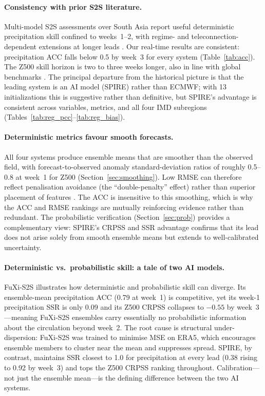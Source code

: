 \documentclass[11pt]{article}
\begin{document}
\paragraph{Consistency with prior S2S literature.}
Multi-model S2S assessments over South Asia report useful deterministic
precipitation skill confined to weeks~1--2, with regime- and
teleconnection-dependent extensions at longer leads
\citep{deandrade2019,white2017,mariotti2020}. Our real-time results are
consistent: precipitation ACC falls below 0.5 by week~3 for every system
(Table~\ref{tab:acc}). The Z500 skill horizon is two to three weeks
longer, also in line with global benchmarks \citep{vitart2017,rasp2024}.
The principal departure from the historical picture is that the leading
system is an AI model (SPIRE) rather than ECMWF; with 13 initializations
this is suggestive rather than definitive, but SPIRE's advantage is
consistent across variables, metrics, and all four IMD subregions
(Tables~\ref{tab:reg_pcc}--\ref{tab:reg_bias}).

\paragraph{Deterministic metrics favour smooth forecasts.}
All four systems produce ensemble means that are smoother than
the observed field, with forecast-to-observed anomaly standard-deviation
ratios of roughly 0.5--0.8 at week~1 for Z500 (Section~\ref{sec:smoothing}).
Low RMSE can therefore reflect penalisation avoidance (the ``double-penalty''
effect) rather than superior placement of features
\citep{murphy1988,benbouallegue2024}. The ACC is insensitive to this
smoothing, which is why the ACC and RMSE rankings are mutually reinforcing
evidence rather than redundant. The probabilistic verification
(Section~\ref{sec:prob}) provides a complementary view: SPIRE's CRPSS
and SSR advantage confirms that its lead does not arise solely from smooth
ensemble means but extends to well-calibrated uncertainty.

\paragraph{Deterministic vs.\ probabilistic skill: a tale of two AI models.}
FuXi-S2S illustrates how deterministic and probabilistic skill can
diverge. Its ensemble-mean precipitation ACC (0.79 at week~1) is
competitive, yet its week-1 precipitation SSR is only 0.09 and its Z500
CRPSS collapses to $-0.55$ by week~3---meaning FuXi-S2S ensembles carry
essentially no probabilistic information about the circulation beyond
week~2. The root cause is structural under-dispersion: FuXi-S2S was
trained to minimise MSE on ERA5, which encourages ensemble members to
cluster near the mean and suppresses spread. SPIRE, by contrast,
maintains SSR closest to 1.0 for precipitation at every lead (0.38
rising to 0.92 by week~3) and tops the Z500 CRPSS ranking throughout.
Calibration---not just the ensemble mean---is the defining difference
between the two AI systems.
\end{document}

